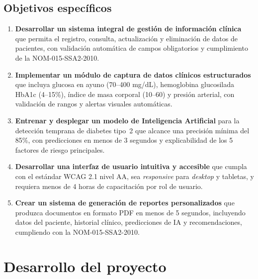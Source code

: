 \documentclass[12pt, letterpaper, twoside]{report}
\begin{document}
\section{Objetivos específicos}

\begin{enumerate}[leftmargin=2cm, label=\textbf{OE\arabic*.}]
  \item \textbf{Desarrollar un sistema integral de gestión de información clínica} que permita el registro, consulta, actualización y eliminación de datos de pacientes, con validación automática de campos obligatorios y cumplimiento de la NOM-015-SSA2-2010.

  \item \textbf{Implementar un módulo de captura de datos clínicos estructurados} que incluya glucosa en ayuno (70--400 mg/dL), hemoglobina glucosilada HbA1c (4--15\%), índice de masa corporal (10--60) y presión arterial, con validación de rangos y alertas visuales automáticas.

  \item \textbf{Entrenar y desplegar un modelo de Inteligencia Artificial} para la detección temprana de diabetes tipo~2 que alcance una precisión mínima del 85\%, con predicciones en menos de 3 segundos y explicabilidad de los 5 factores de riesgo principales.

  \item \textbf{Desarrollar una interfaz de usuario intuitiva y accesible} que cumpla con el estándar WCAG 2.1 nivel AA, sea \textit{responsive} para \textit{desktop} y tabletas, y requiera menos de 4 horas de capacitación por rol de usuario.

  \item \textbf{Crear un sistema de generación de reportes personalizados} que produzca documentos en formato PDF en menos de 5 segundos, incluyendo datos del paciente, historial clínico, predicciones de IA y recomendaciones, cumpliendo con la NOM-015-SSA2-2010.
\end{enumerate}

\chapter{Desarrollo del proyecto}
\end{document}
